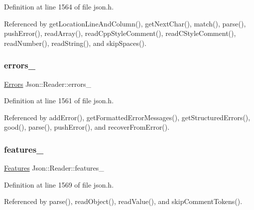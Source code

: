 Definition at line 1564 of file json.\+h.



Referenced by get\+Location\+Line\+And\+Column(), get\+Next\+Char(), match(), parse(), push\+Error(), read\+Array(), read\+Cpp\+Style\+Comment(), read\+C\+Style\+Comment(), read\+Number(), read\+String(), and skip\+Spaces().

\mbox{\label{class_json_1_1_reader_a1bbce45dc4df753bed60c129f4b5147c}} 
\subsubsection{\texorpdfstring{errors\+\_\+}{errors\_}}
{\footnotesize\ttfamily \hyperlink{class_json_1_1_reader_aae51e8f5bab3f067261c842a3ef858e5}{Errors} Json\+::\+Reader\+::errors\+\_\+\hspace{0.3cm}{\ttfamily [private]}}



Definition at line 1561 of file json.\+h.



Referenced by add\+Error(), get\+Formatted\+Error\+Messages(), get\+Structured\+Errors(), good(), parse(), push\+Error(), and recover\+From\+Error().

\mbox{\label{class_json_1_1_reader_aa9984ff8f519b5541346157b7aebf97b}} 
\subsubsection{\texorpdfstring{features\+\_\+}{features\_}}
{\footnotesize\ttfamily \hyperlink{class_json_1_1_features}{Features} Json\+::\+Reader\+::features\+\_\+\hspace{0.3cm}{\ttfamily [private]}}



Definition at line 1569 of file json.\+h.



Referenced by parse(), read\+Object(), read\+Value(), and skip\+Comment\+Tokens().

\mbox{\label{class_json_1_1_reader_a87cc75ae5adc6a6755f0ba1c7255ff6c}} 
